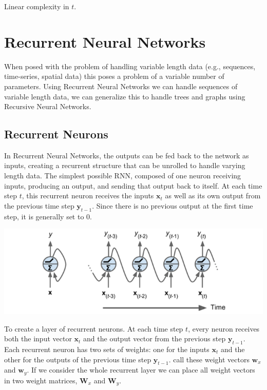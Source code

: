 \documentclass[12pt]{article}
\begin{document}
                Linear complexity in $t$.

\section{Recurrent Neural Networks} \label{sec:RNN}
    When posed with the problem of handling variable length data (e.g., sequences, time-series, spatial data) this poses
    a problem of a variable number of parameters. Using Recurrent Neural Networks we can handle sequences of variable
    length data, we can generalize this to handle trees and graphs using Recursive Neural Networks.

    \subsection{Recurrent Neurons}
        In Recurrent Neural Networks, the outputs can be fed back to the network as inputs, creating a recurrent
        structure that can be unrolled to handle varying length data. The simplest possible RNN, composed of one neuron
        receiving inputs, producing an output, and sending that output back to itself. At each time step $t$, this
        recurrent neuron receives the inputs $\boldsymbol{x}_t$ as well as its own output from the previous time step
        $\boldsymbol{y}_{t-1}$. Since there is no previous output at the first time step, it is generally set to 0. 

        \begin{center}
            \includegraphics[scale=0.65]{RecurrentNeuron}
        \end{center}

        To create a layer of recurrent neurons. At each time step $t$, every neuron receives both the input vector $\boldsymbol{x}_t$
        and the output vector from the previous step $\boldsymbol{y}_{t-1}$. Each recurrent neuron has two sets of weights: one for
        the inputs $\boldsymbol{x}_t$ and the other for the outputs of the previous time step $\boldsymbol{y}_{t-1}$.
        call these weight vectors $\boldsymbol{w}_x$ and $\boldsymbol{w}_y$. If we consider the whole recurrent layer we
        can place all weight vectors in two weight matrices, $\boldsymbol{W}_x$ and $\boldsymbol{W}_y$. 
\end{document}
